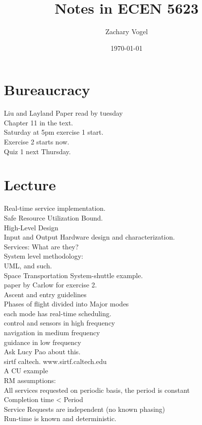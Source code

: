 \documentclass{article}
\author{Zachary Vogel}
\date{\today}
\title{Notes in ECEN 5623}
\begin{document}
\maketitle


\section*{Bureaucracy}
Liu and Layland Paper read by tuesday\\
Chapter 11 in the text.\\
Saturday at 5pm exercise 1 start.\\
Exercise 2 starts now.\\
Quiz 1 next Thursday.

\section*{Lecture}
Real-time service implementation.\\

Safe Resource Utilization Bound.\\

High-Level Design\\
Input and Output Hardware design and characterization.\\
Services: What are they?\\
System level methodology:\\
UML, and such.\\

Space Transportation System-shuttle example.\\
paper by Carlow for exercise 2.\\
Ascent and entry guidelines\\
Phases of flight divided into Major modes\\
each mode has real-time scheduling.\\
control and sensors in high frequency\\
navigation in medium frequency\\
guidance in low frequency\\
Ask Lucy Pao about this.\\

sirtf caltech. www.sirtf.caltech.edu\\
A CU example\\

RM assumptions:\\
All services requested on periodic basis, the period is constant\\
Completion time < Period\\
Service Requests are independent (no known phasing)\\
Run-time is known and deterministic.\\
\end{document}
